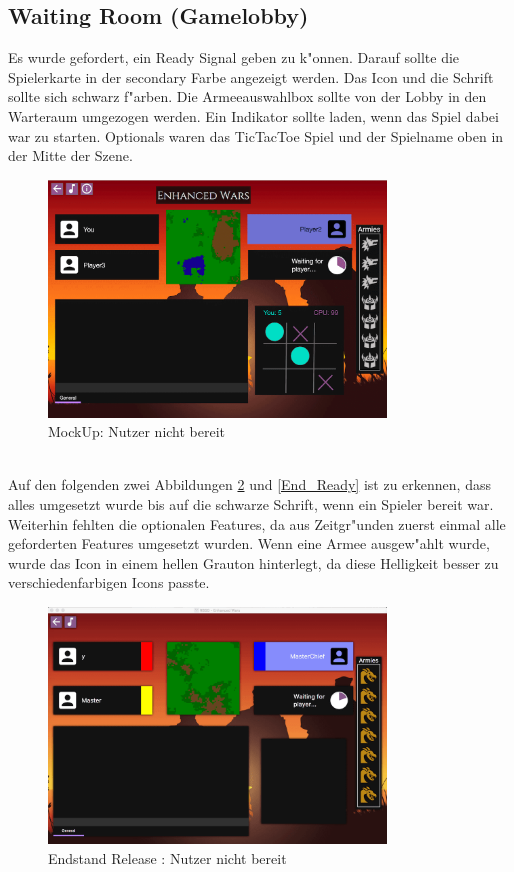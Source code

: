 \documentclass[12pt, titlepage]{scrartcl}
\newcommand{\RN}[1]{%
	\textup{\uppercase\expandafter{\romannumeral#1}}%
}
\begin{document}
		\subsection{Waiting Room (Gamelobby)}
			Es wurde gefordert, ein Ready Signal geben zu k"onnen. Darauf sollte die Spielerkarte in der secondary Farbe angezeigt werden. Das Icon und die Schrift sollte sich schwarz f"arben. Die Armeeauswahlbox sollte von der Lobby in den Warteraum umgezogen werden. Ein Indikator sollte laden, wenn das Spiel dabei war zu starten. Optionals waren das TicTacToe Spiel und der Spielname oben in der Mitte der Szene.
			\begin{figure}[H] 
				\centering
				\includegraphics[width=0.8\textwidth]{images/mockUps/NotReady.png}
				\caption{MockUp: Nutzer nicht bereit}
				\label{Not_Ready_2}
			\end{figure}
			\ \\ Auf den folgenden zwei Abbildungen \ref{End_Not_Ready} und \ref{End_Ready} ist zu erkennen, dass alles umgesetzt wurde bis auf die schwarze Schrift, wenn ein Spieler bereit war. Weiterhin fehlten die optionalen Features, da aus Zeitgr"unden zuerst einmal alle geforderten Features umgesetzt wurden. Wenn eine Armee ausgew"ahlt wurde, wurde das Icon in einem hellen Grauton hinterlegt, da diese Helligkeit besser zu verschiedenfarbigen Icons passte.
			\begin{figure}[H] 
				\centering
				\includegraphics[width=0.8\textwidth]{images/endOfRelease/NotReady.png}
				\caption{Endstand Release \RN{3}: Nutzer nicht bereit}
				\label{End_Not_Ready}
			\end{figure}
\end{document}
